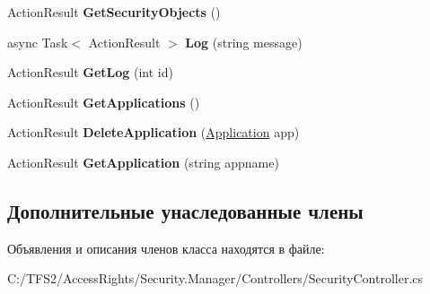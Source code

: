 \begin{DoxyCompactItemize}
Action\+Result {\bfseries Get\+Security\+Objects} ()
\item 
\mbox{\label{class_security_1_1_manager_1_1_controllers_1_1_security_controller_a2b89a6afd1586b34830dc1f1fc7a72eb}} 
async Task$<$ Action\+Result $>$ {\bfseries Log} (string message)
\item 
\mbox{\label{class_security_1_1_manager_1_1_controllers_1_1_security_controller_ac9f5b928d8bf10da7b39576ff2a8c07e}} 
Action\+Result {\bfseries Get\+Log} (int id)
\item 
\mbox{\label{class_security_1_1_manager_1_1_controllers_1_1_security_controller_aa0651eb63c9b117f76ee18e41c385474}} 
Action\+Result {\bfseries Get\+Applications} ()
\item 
\mbox{\label{class_security_1_1_manager_1_1_controllers_1_1_security_controller_a411aed33f0f0da27f2a82c1782d9a708}} 
Action\+Result {\bfseries Delete\+Application} (\hyperlink{class_security_1_1_model_1_1_application}{Application} app)
\item 
\mbox{\label{class_security_1_1_manager_1_1_controllers_1_1_security_controller_acee31c0e1314f6d467d80f5f0bf97e63}} 
Action\+Result {\bfseries Get\+Application} (string appname)
\end{DoxyCompactItemize}
\subsection*{Дополнительные унаследованные члены}


Объявления и описания членов класса находятся в файле\+:\begin{DoxyCompactItemize}
\item 
C\+:/\+T\+F\+S2/\+Access\+Rights/\+Security.\+Manager/\+Controllers/Security\+Controller.\+cs\end{DoxyCompactItemize}
